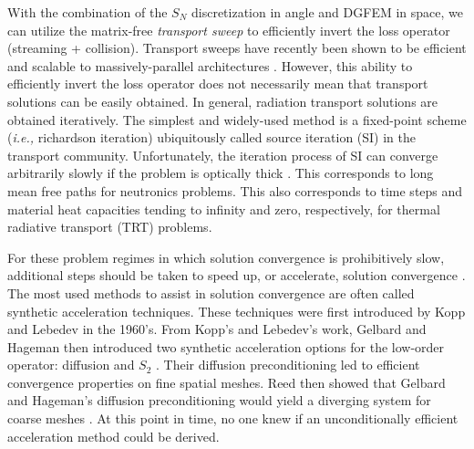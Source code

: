 \documentclass[11pt]{article}
\begin{document}
With the combination of the $S_N$ discretization in angle and DGFEM in space, we can utilize the matrix-free {\em transport sweep} to efficiently invert the loss operator (streaming + collision). Transport sweeps have recently been shown to be efficient and scalable to massively-parallel architectures \cite{ref::eff_sweeps,adams2013provably}. However, this ability to efficiently invert the loss operator does not necessarily mean that transport solutions can be easily obtained. In general, radiation transport solutions are obtained iteratively. The simplest and widely-used method is a fixed-point scheme ({\em i.e.,} richardson iteration) ubiquitously called source iteration (SI) in the transport community. Unfortunately, the iteration process of SI can converge arbitrarily slowly if the problem is optically thick \cite{ref::adams_larsen_iter_methods}. This corresponds to long mean free paths for neutronics problems. This also corresponds to time steps and material heat capacities tending to infinity and zero, respectively, for thermal radiative transport (TRT) problems.

For these problem regimes in which solution convergence is prohibitively slow, additional steps should be taken to speed up, or accelerate, solution convergence \cite{ref::adams_larsen_iter_methods}. The most used methods to assist in solution convergence are often called synthetic acceleration techniques. These techniques were first introduced by Kopp  \cite{kopp1963synthetic} and Lebedev \cite{lebedevI} in the 1960's. From Kopp's and Lebedev's work, Gelbard and Hageman then introduced two synthetic acceleration options for the low-order operator: diffusion and $S_2$ \cite{gelbard1969synthetic}. Their diffusion preconditioning led to efficient convergence properties on fine spatial meshes. Reed then showed that Gelbard and Hageman's diffusion preconditioning would yield a diverging system for coarse meshes \cite{reed1971effectiveness}. At this point in time, no one knew if an unconditionally efficient acceleration method could be derived.
\end{document}
